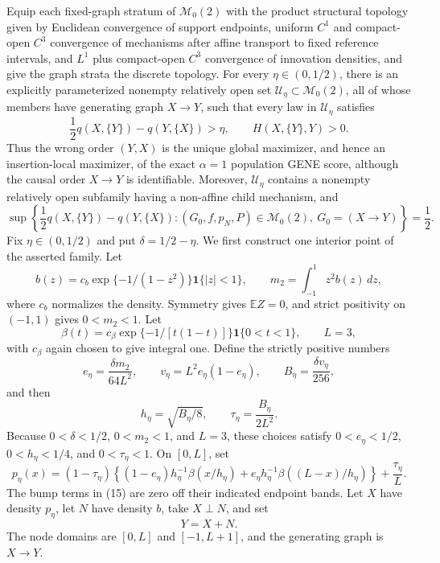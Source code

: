 Equip each fixed-graph stratum of \(\mathcal M_0(2)\) with the product structural topology given by Euclidean convergence of support endpoints, uniform \(C^1\) and compact-open \(C^3\) convergence of mechanisms after affine transport to fixed reference intervals, and \(L^1\) plus compact-open \(C^3\) convergence of innovation densities, and give the graph strata the discrete topology. For every \(\eta\in(0,1/2)\), there is an explicitly parameterized nonempty relatively open set \(\mathcal U_\eta\subset\mathcal M_0(2)\), all of whose members have generating graph \(X\to Y\), such that every law in \(\mathcal U_\eta\) satisfies
\[
 \frac12q(X,\{Y\})-q(Y,\{X\})>\eta,
 \qquad H(X,\{Y\},Y)>0.
\]
Thus the wrong order \((Y,X)\) is the unique global maximizer, and hence an insertion-local maximizer, of the exact \(\alpha=1\) population GENE score, although the causal order \(X\to Y\) is identifiable. Moreover, \(\mathcal U_\eta\) contains a nonempty relatively open subfamily having a non-affine child mechanism, and
\[
 \sup\left\{\frac12q(X,\{Y\})-q(Y,\{X\}):(G_0,f,p_N,P)\in\mathcal M_0(2),\ G_0=(X\to Y)\right\}=\frac12.
\]
Fix \(\eta\in(0,1/2)\) and put \(\delta=1/2-\eta\).  We first construct one interior point of the asserted family.  Let
\[
 b(z)=c_b\exp\{-1/(1-z^2)\}\mathbf 1\{|z|<1\},
 \qquad m_2=\int_{-1}^1z^2b(z)\,dz,
\]
where \(c_b\) normalizes the density.  Symmetry gives \(\mathbb E Z=0\), and strict positivity on \((-1,1)\) gives \(0<m_2<1\).  Let
\[
 \beta(t)=c_\beta\exp\{-1/[t(1-t)]\}\mathbf 1\{0<t<1\},
 \qquad L=3,
\]
with \(c_\beta\) again chosen to give integral one.  Define the strictly positive numbers
\[
 e_\eta=\frac{\delta m_2}{64L^2},\qquad
 v_\eta=L^2e_\eta(1-e_\eta),\qquad
 B_\eta=\frac{\delta v_\eta}{256},
\]
and then
\[
 h_\eta=\sqrt{B_\eta/8},
 \qquad \tau_\eta=\frac{B_\eta}{2L^2}.
\]
Because \(0<\delta<1/2\), \(0<m_2<1\), and \(L=3\), these choices satisfy \(0<e_\eta<1/2\), \(0<h_\eta<1/4\), and \(0<\tau_\eta<1\).  On \([0,L]\), set
\[
 p_\eta(x)=(1-\tau_\eta)
 \left\{(1-e_\eta)h_\eta^{-1}\beta(x/h_\eta)
 +e_\eta h_\eta^{-1}\beta((L-x)/h_\eta)\right\}
 +\frac{\tau_\eta}{L}. \tag{15}
\]
The bump terms in (15) are zero off their indicated endpoint bands.  Let \(X\) have density \(p_\eta\), let \(N\) have density \(b\), take \(X\perp N\), and set
\[
 Y=X+N. \tag{16}
\]
The node domains are \([0,L]\) and \([-1,L+1]\), and the generating graph is \(X\to Y\).

